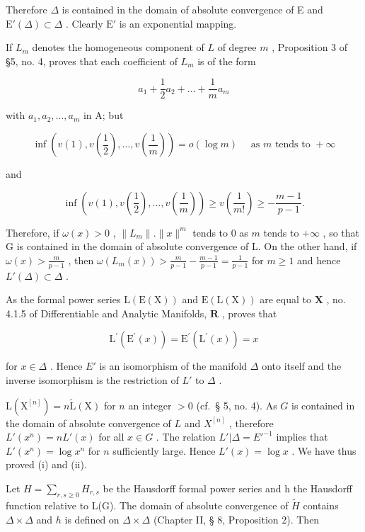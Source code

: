 Therefore \(\Delta\) is contained in the domain of absolute convergence of E and \(\mathrm{E}'(\Delta) \subset \Delta\) . Clearly \(\mathrm{E}'\) is an exponential mapping.

If \(L_{m}\) denotes the homogeneous component of \(L\) of degree \(m\) , Proposition 3 of §5, no. 4, proves that each coefficient of \(L_{m}\) is of the form

\[
a _ {1} + \frac {1}{2} a _ {2} + \dots + \frac {1}{m} a _ {m}
\]

with \(a_1, a_2, \ldots, a_m\) in A; but

\[
\inf \left(v (1), v \left(\frac {1}{2}\right), \dots , v \left(\frac {1}{m}\right)\right) = o (\log m) \quad \text { as   } m \text {   tends   to   } + \infty
\]

and

\[
\inf \left(v (1), v \left(\frac {1}{2}\right), \dots , v \left(\frac {1}{m}\right)\right) \geqslant v \left(\frac {1}{m !}\right) \geqslant - \frac {m - 1}{p - 1}.
\]

Therefore, if \(\omega(x) > 0\) , \(\|L_m\|. \|x\|^m\) tends to 0 as \(m\) tends to \(+\infty\) , so that G is contained in the domain of absolute convergence of L. On the other hand, if \(\omega(x) > \frac{m}{p-1}\) , then \(\omega(L_m(x)) > \frac{m}{p-1} - \frac{m-1}{p-1} = \frac{1}{p-1}\) for \(m \geqslant 1\) and hence \(L'(\Delta) \subset \Delta\) .

As the formal power series \(\mathrm{L}(\mathrm{E}(\mathrm{X}))\) and \(\mathrm{E}(\mathrm{L}(\mathrm{X}))\) are equal to \(\mathbf{X}\) , no. 4.1.5 of Differentiable and Analytic Manifolds, \(\mathbf{R}\) , proves that

\[
\mathrm{L} ^ {\prime} (\mathrm{E} ^ {\prime} (x)) = \mathrm{E} ^ {\prime} (\mathrm{L} ^ {\prime} (x)) = x
\]

for \(x \in \Delta\) . Hence \(E'\) is an isomorphism of the manifold \(\Delta\) onto itself and the inverse isomorphism is the restriction of \(L'\) to \(\Delta\) .

\(\mathrm{L}(\mathrm{X}^{[n]}) = n\tilde{\mathrm{L}}(\mathrm{X})\) for \(n\) an integer \(> 0\) (cf.~§ 5, no. 4). As \(G\) is contained in the domain of absolute convergence of \(L\) and \(X^{[n]}\) , therefore \(L'(x^n) = nL'(x)\) for all \(x \in G\) . The relation \(L'| \Delta = E'^{-1}\) implies that \(L'(x^n) = \log x^n\) for \(n\) sufficiently large. Hence \(L'(x) = \log x\) . We have thus proved (i) and (ii).

Let \(H = \sum_{r,s \geq 0} H_{r,s}\) be the Hausdorff formal power series and h the Hausdorff function relative to L(G). The domain of absolute convergence of \(\tilde{H}\) contains \(\Delta \times \Delta\) and \(h\) is defined on \(\Delta \times \Delta\) (Chapter II, § 8, Proposition 2). Then

